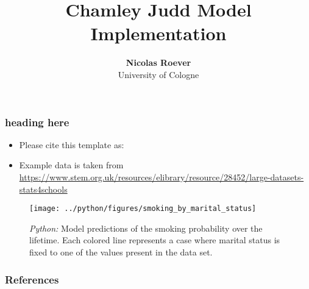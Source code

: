 \documentclass[11pt, aspectratio=169]{beamer}
\begin{document}
\title{Chamley Judd Model Implementation}

\author[Nicolas Roever]
{
{\bf Nicolas Roever}\\
{\small University of Cologne}\\[1ex]
}


\begin{frame}
    \titlepage
    \note{~}
\end{frame}


\begin{frame}[t]
    \frametitle{heading here}
    \begin{itemize}
        \item<+-> Please cite this template as: \citet{GaudeckerEconProjectTemplates}
        \item<+-> Example data is taken from \url{https://www.stem.org.uk/resources/elibrary/resource/28452/large-datasets-stats4schools}
    \end{itemize}
    \note{~}
\end{frame}



\begin{frame}[t]
    \begin{figure}[H]

        \centering
        \texttt{[image: ../python/figures/smoking\_by\_marital\_status]}

        \caption{\emph{Python:} Model predictions of the smoking probability over the
            lifetime. Each colored line represents a case where marital status is fixed to
            one of the values present in the data set.}
        \label{fig:python-predictions}

    \end{figure}
\end{frame}






 {
    \begin{frame}
        \frametitle{}
    \end{frame}

}

\begin{frame}[allowframebreaks]
    \frametitle{References}
    \renewcommand{\bibfont}{\normalfont\footnotesize}
    \printbibliography
\end{frame}
\end{document}
